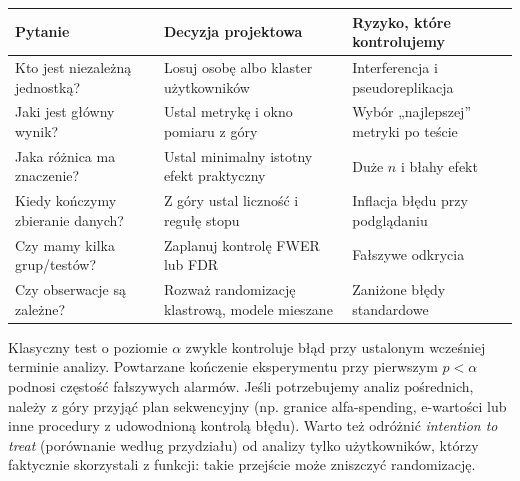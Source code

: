 \begin{center}\small
\begin{tabular}{>{\raggedright\arraybackslash}p{}>{\raggedright\arraybackslash}p{}>{\raggedright\arraybackslash}p{}}
\toprule
\textbf{Pytanie} & \textbf{Decyzja projektowa} & \textbf{Ryzyko, które kontrolujemy}\\
\midrule
Kto jest niezależną jednostką? & Losuj osobę albo klaster użytkowników & Interferencja i pseudoreplikacja\\
Jaki jest główny wynik? & Ustal metrykę i okno pomiaru z góry & Wybór „najlepszej” metryki po teście\\
Jaka różnica ma znaczenie? & Ustal minimalny istotny efekt praktyczny & Duże $n$ i błahy efekt\\
Kiedy kończymy zbieranie danych? & Z góry ustal liczność i regułę stopu & Inflacja błędu przy podglądaniu\\
Czy mamy kilka grup/testów? & Zaplanuj kontrolę FWER lub FDR & Fałszywe odkrycia\\
Czy obserwacje są zależne? & Rozważ randomizację klastrową, modele mieszane & Zaniżone błędy standardowe\\
\bottomrule
\end{tabular}
\end{center}

\begin{uwaga}
Klasyczny test o poziomie $\alpha$ zwykle kontroluje błąd przy ustalonym wcześniej terminie analizy. Powtarzane kończenie eksperymentu przy pierwszym $p<\alpha$ podnosi częstość fałszywych alarmów. Jeśli potrzebujemy analiz pośrednich, należy z góry przyjąć plan sekwencyjny (np. granice alfa-spending, e-wartości lub inne procedury z udowodnioną kontrolą błędu). Warto też odróżnić \emph{intention to treat} (porównanie według przydziału) od analizy tylko użytkowników, którzy faktycznie skorzystali z funkcji: takie przejście może zniszczyć randomizację.
\end{uwaga}

